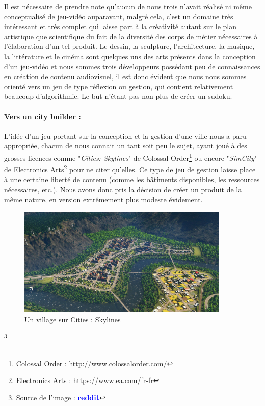 \documentclass[a4paper,10pt,openany,oneside]{report}
\newcommand\blfootnote[1]{%
  \begingroup
  \renewcommand\thefootnote{}\footnote{#1}%
  \addtocounter{footnote}{-1}%
  \endgroup
}
\begin{document}
Il est nécessaire de prendre note qu'aucun de nous trois n'avait réalisé ni même conceptualisé de jeu-vidéo auparavant, malgré cela, c'est un domaine très intéressant et très complet qui laisse part à la créativité autant sur le plan artistique que scientifique du fait de la diversité des corps de métier nécessaires à l'élaboration d'un tel produit. Le dessin, la sculpture, l'architecture, la musique, la littérature et le cinéma sont quelques uns des arts présents dans la conception d'un jeu-vidéo et nous sommes trois développeurs possédant peu de connaissances en création de contenu audiovisuel, il est donc évident que nous nous sommes orienté vers un jeu de type réflexion ou gestion, qui contient relativement beaucoup d'algorithmie. Le but n'étant pas non plus de créer un sudoku.

\paragraph{Vers un city builder :}
L'idée d'un jeu portant sur la conception et la gestion d'une ville nous a paru appropriée, chacun de nous connait un tant soit peu le sujet, ayant joué à des grosses licences comme "\textit{Cities: Skylines}" de Colossal Order\footnote{Colossal Order : \textcolor{blue}{\url{http://www.colossalorder.com/}}} ou encore "\textit{SimCity}" de Electronics Arts\footnote{Electronics Arts : \textcolor{blue}{\url{https://www.ea.com/fr-fr}}} pour ne citer qu'elles. Ce type de jeu de gestion laisse place à une certaine liberté de contenu (comme les bâtiments disponibles, les ressources nécessaires, etc.). Nous avons donc pris la décision de créer un produit de la même nature, en version extrêmement plus modeste évidement.
\begin{center}
	\begin{figure}[h]
	\centering
	\includegraphics[width=0.9\textwidth]{img/img_intro_cscity.jpg}
	\caption{\label{fig:Cities: Skylines city}Un village sur Cities : Skylines}
	\end{figure}
\end{center}
\blfootnote{\hspace{7pt}Source de l'image : \href{https://www.reddit.com/r/CitiesSkylines/comments/3mubt5/finally_my_first_city_in_more_then_80_hours_i/}{\textbf{\textcolor{blue}{reddit}}}}
\thispagestyle{empty}
\end{document}
